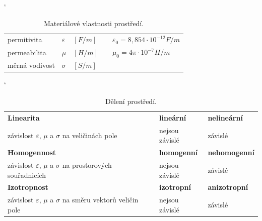 \begin{table}[!h]
\catcode` 
\begin{center}
  	\caption{Materiálové vlastnosti prostředí.}
  	\label{tab:evlny_parametry_prostredi}
\begin{tabular}{|lllp{1.5cm}l|}
	\hline
	permitivita		& $\varepsilon$	& $\unit{[F/m]}$ & 	& $\varepsilon_{0} = 8,854\cdot10^{-12}\unit{F/m} $\\
	
	permeabilita		& $\mu$		& $\unit{[H/m]}$ & 	& $\mu_{0} = 4\pi\cdot10^{-7}\unit{H/m}$\\
	
	měrná vodivost	& $\sigma$		& $\unit{[S/m]}$ & 	&\\
	\hline
\end{tabular}
\end{center}
\end{table}
\begin{table}[!h]
\catcode` 
\begin{center}
  	\caption{Dělení prostředí.}
  	\label{tab:evlny_vlastnosti_prostredi}
\begin{tabular}{|lp{0.3cm}|l|l|}
	\hline
	{\bf Linearita}									& & {\bf lineární}	& {\bf nelineární}	\\
	závislost $\varepsilon$, $\mu$ a $\sigma$ na veličinách pole 		& & nejsou závislé 	& závislé		\\ 
	\hline
	{\bf Homogennost}								& & {\bf homogenní}	& {\bf nehomogenní}	\\
	závislost $\varepsilon$, $\mu$ a $\sigma$ na prostorových souřadnicích 	& & nejsou závislé 	& závislé		\\
	\hline
	{\bf Izotropnost}								& & {\bf izotropní}	& {\bf anizotropní}	\\
	závislost $\varepsilon$, $\mu$ a $\sigma$ na směru vektorů veličin pole 	& & nejsou závislé 	& závislé		\\
	\hline
\end{tabular}
\end{center}
\end{table}

